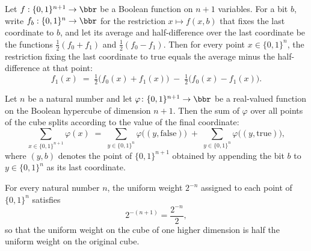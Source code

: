 \begin{lemma}
\label{BooleanAnalysis.Hypercontractivity.restrictLast_true_eq}
\leanok
{}
Let $f : \{0,1\}^{n+1} \to \bbr$ be a Boolean function on $n+1$ variables. For a bit
$b$, write $f_b : \{0,1\}^n \to \bbr$ for the restriction $x \mapsto f(x,b)$ that fixes
the last coordinate to $b$, and let its average and half-difference over the last
coordinate be the functions $\tfrac12(f_0 + f_1)$ and $\tfrac12(f_0 - f_1)$. Then for
every point $x \in \{0,1\}^n$, the restriction fixing the last coordinate to
$\mathrm{true}$ equals the average minus the half-difference at that point:
\[
f_1(x) \;=\; \tfrac12\bigl(f_0(x) + f_1(x)\bigr) \;-\; \tfrac12\bigl(f_0(x) -
f_1(x)\bigr).
\]
\end{lemma}

\begin{lemma}
\label{BooleanAnalysis.Hypercontractivity.sum_boolCube_succ}
\leanok
{}
Let $n$ be a natural number and let $\varphi \colon \{0,1\}^{n+1} \to \bbr$ be a
real-valued function on the Boolean hypercube of dimension $n+1$. Then the sum of
$\varphi$ over all points of the cube splits according to the value of the final
coordinate:
\[
\sum_{x \in \{0,1\}^{n+1}} \varphi(x) \;=\; \sum_{y \in \{0,1\}^{n}}
\varphi\bigl((y,\mathrm{false})\bigr) \;+\; \sum_{y \in \{0,1\}^{n}}
\varphi\bigl((y,\mathrm{true})\bigr),
\]
where $(y,b)$ denotes the point of $\{0,1\}^{n+1}$ obtained by appending the bit $b$ to
$y \in \{0,1\}^{n}$ as its last coordinate.
\end{lemma}

\begin{lemma}
\label{BooleanAnalysis.Hypercontractivity.uniformWeight_succ}
\leanok
{}
For every natural number $n$, the uniform weight $2^{-n}$ assigned to each point of
$\{0,1\}^n$ satisfies \[2^{-(n+1)} = \frac{2^{-n}}{2},\] so that the uniform weight on
the cube of one higher dimension is half the uniform weight on the original cube.
\end{lemma}

